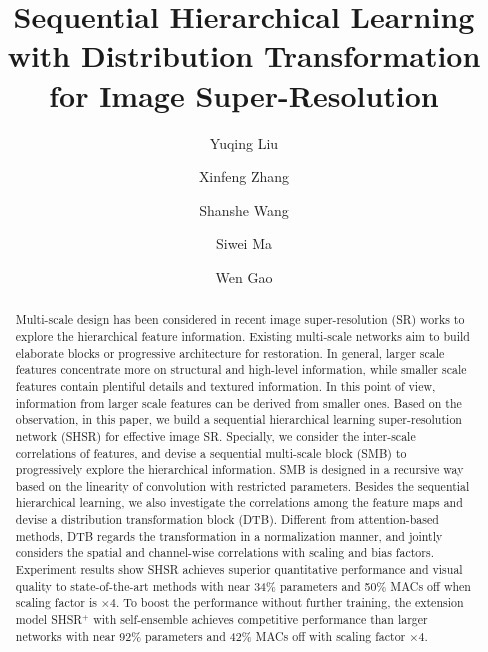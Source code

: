 \documentclass[manuscript,screen]{acmart}
\begin{document}
\title[SHSR]{Sequential Hierarchical Learning with Distribution Transformation for Image Super-Resolution}

\author{Yuqing Liu}

\author{Xinfeng Zhang}

\author{Shanshe Wang}

\author{Siwei Ma}

\author{Wen Gao}






\renewcommand{\shortauthors}{Liu, et al.}

\begin{abstract}
    Multi-scale design has been considered in recent image super-resolution (SR) works to explore the hierarchical feature information. 
    Existing multi-scale networks aim to build elaborate blocks or progressive architecture for restoration.
    In general, larger scale features concentrate more on structural and high-level information, while smaller scale features contain plentiful details and textured information. 
    In this point of view, information from larger scale features can be derived from smaller ones.
Based on the observation, in this paper, we build a sequential hierarchical learning super-resolution network (SHSR) for effective image SR. 
    Specially, we consider the inter-scale correlations of features, and devise a sequential multi-scale block (SMB) to progressively explore the hierarchical information.
    SMB is designed in a recursive way based on the linearity of convolution with restricted parameters.
    Besides the sequential hierarchical learning, we also investigate the correlations among the feature maps and devise a distribution transformation block (DTB).
    Different from attention-based methods, DTB regards the transformation in a normalization manner, and jointly considers the spatial and channel-wise correlations with scaling and bias factors.
    Experiment results show SHSR achieves superior quantitative performance and visual quality to state-of-the-art methods with near 34\% parameters and 50\% MACs off when scaling factor is $\times4$.
    To boost the performance without further training, the extension model SHSR$^+$ with self-ensemble achieves competitive performance than larger networks with near 92\% parameters and 42\% MACs off with scaling factor $\times4$.
\end{abstract}
\end{document}
